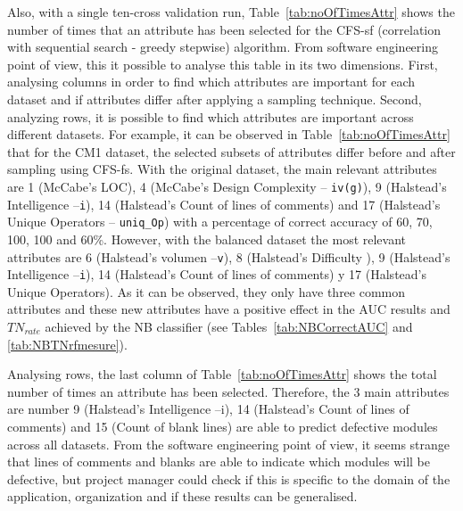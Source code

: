 \documentclass{elsart}
\begin{document}
Also, with a single ten-cross validation run, Table~\ref{tab:noOfTimesAttr} shows the number of times that an attribute has been selected for the CFS-sf (correlation with sequential search - greedy stepwise) algorithm. From software engineering point of view, this it possible to analyse this table in its two dimensions. First, analysing columns in order to find which attributes are important for each dataset and if attributes differ after applying a sampling technique. Second, analyzing rows, it is possible to find which attributes are important across different datasets. For example, it can be observed in Table~\ref{tab:noOfTimesAttr} that for the CM1 dataset, the selected subsets of attributes differ before and after sampling using CFS-fs.
With the original dataset, the main relevant attributes are 1 (McCabe's LOC), 4 (McCabe's Design Complexity -- \texttt{iv(g)}), 9
(Halstead's Intelligence --\texttt{i}), 14 (Halstead's Count of lines of comments) and 17 (Halstead's Unique Operators --
\texttt{uniq\_Op}) with a percentage of correct accuracy of 60, 70, 100, 100 and 60\%. However, with the balanced dataset the most
relevant attributes are 6 (Halstead's volumen --\texttt{v}), 8 (Halstead's Difficulty ), 9 (Halstead's Intelligence --\texttt{i}),
14 (Halstead's Count of lines of comments) y 17 (Halstead's Unique Operators). As it can be observed, they only have three common
attributes and these new attributes have a positive effect in the AUC results and $TN_{rate}$ achieved by the NB classifier (see
Tables~\ref{tab:NBCorrectAUC} and \ref{tab:NBTNrfmesure}).

Analysing rows, the last column of Table~\ref{tab:noOfTimesAttr} shows the total number of times an attribute has been selected.
Therefore, the 3 main attributes are number 9 (Halstead's Intelligence --i), 14 (Halstead's Count of lines of comments) and 15
(Count of blank lines) are able to predict defective modules across all datasets. From the software engineering point of view, it seems strange that lines of comments and blanks are able to indicate which modules will be defective, but project manager could check if this is specific to the domain of the application, organization and if these results can be generalised.
\end{document}
